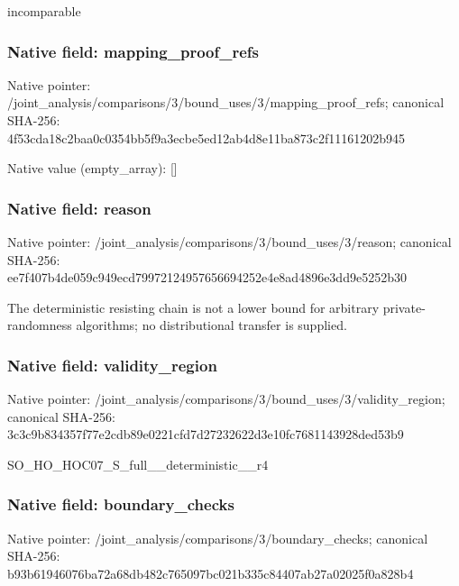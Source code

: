 \documentclass[10pt,a4paper]{article}
\begin{document}
\begingroup\raggedright\sloppy incomparable\par\endgroup

\subsubsection{Native field: mapping\_\allowbreak{}proof\_\allowbreak{}refs}
Native pointer: /joint\_\allowbreak{}analysis/comparisons/3/bound\_\allowbreak{}uses/3/mapping\_\allowbreak{}proof\_\allowbreak{}refs; canonical SHA-256: 4f53cda18c2baa0c0354bb5f9a3ecbe5ed12ab4d8e11ba873c2f11161202b945

Native value (empty\_\allowbreak{}array): []

\subsubsection{Native field: reason}
Native pointer: /joint\_\allowbreak{}analysis/comparisons/3/bound\_\allowbreak{}uses/3/reason; canonical SHA-256: ee7f407b4de059c949ecd79972124957656694252e4e8ad4896e3dd9e5252b30

\begingroup\raggedright\sloppy The deterministic resisting chain is not a lower bound for arbitrary private-randomness algorithms;\allowbreak{} no distributional transfer is supplied.\par\endgroup

\subsubsection{Native field: validity\_\allowbreak{}region}
Native pointer: /joint\_\allowbreak{}analysis/comparisons/3/bound\_\allowbreak{}uses/3/validity\_\allowbreak{}region; canonical SHA-256: 3c3c9b834357f77e2cdb89e0221cfd7d27232622d3e10fc7681143928ded53b9

\begingroup\raggedright\sloppy SO\_\allowbreak{}HO\_\allowbreak{}HOC07\_\allowbreak{}S\_\allowbreak{}full\_\allowbreak{}\_\allowbreak{}deterministic\_\allowbreak{}\_\allowbreak{}r4\par\endgroup

\subsubsection{Native field: boundary\_\allowbreak{}checks}
Native pointer: /joint\_\allowbreak{}analysis/comparisons/3/boundary\_\allowbreak{}checks; canonical SHA-256: b93b61946076ba72a68db482c765097bc021b335c84407ab27a02025f0a828b4
\end{document}
